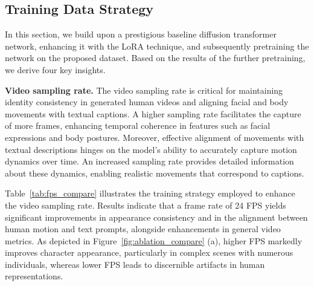     




\subsection{Training Data Strategy}
\label{sec：training_strategy}
In this section, we build upon a prestigious baseline diffusion transformer network, enhancing it with the LoRA technique, and subsequently pretraining the network on the proposed dataset.
Based on the results of the further pretraining, we derive four key insights.

\noindent\textbf{Video sampling rate.}
The video sampling rate is critical for maintaining identity consistency in generated human videos and aligning facial and body movements with textual captions. 
A higher sampling rate facilitates the capture of more frames, enhancing temporal coherence in features such as facial expressions and body postures. 
Moreover, effective alignment of movements with textual descriptions hinges on the model's ability to accurately capture motion dynamics over time. 
An increased sampling rate provides detailed information about these dynamics, enabling realistic movements that correspond to captions.

Table~\ref{tab:fps_compare} illustrates the training strategy employed to enhance the video sampling rate. Results indicate that a frame rate of 24 FPS yields significant improvements in appearance consistency and in the alignment between human motion and text prompts, alongside enhancements in general video metrics. 
As depicted in Figure~\ref{fig:ablation_compare} (a), higher FPS markedly improves character appearance, particularly in complex scenes with numerous individuals, whereas lower FPS leads to discernible artifacts in human representations.

